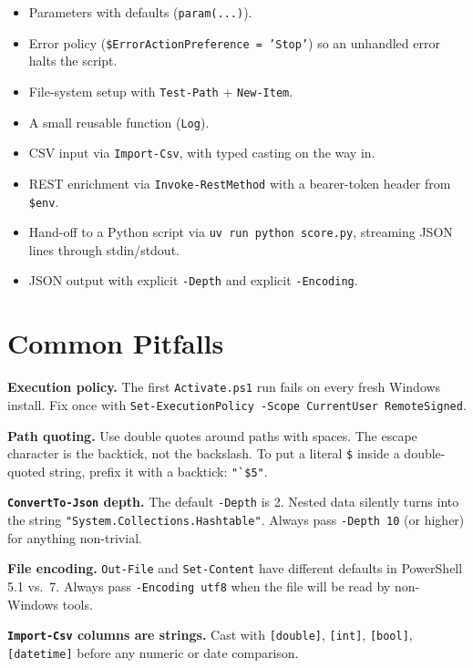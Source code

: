 \documentclass[11pt,a4paper]{article}
\newcommand{\cmd}[1]{\texttt{\textcolor{pwshKw}{#1}}}
\begin{document}
\begin{itemize}[leftmargin=*]
\item Parameters with defaults (\texttt{param(...)}).
\item Error policy (\texttt{\$ErrorActionPreference = 'Stop'}) so an
unhandled error halts the script.
\item File-system setup with \cmd{Test-Path} + \cmd{New-Item}.
\item A small reusable function (\texttt{Log}).
\item CSV input via \cmd{Import-Csv}, with typed casting on the way in.
\item REST enrichment via \cmd{Invoke-RestMethod} with a bearer-token
header from \texttt{\$env}.
\item Hand-off to a Python script via \texttt{uv run python score.py},
streaming JSON lines through stdin/stdout.
\item JSON output with explicit \texttt{-Depth} and explicit
\texttt{-Encoding}.
\end{itemize}

\section{Common Pitfalls}

\textbf{Execution policy.} The first \texttt{Activate.ps1} run fails on
every fresh Windows install. Fix once with
\texttt{Set-ExecutionPolicy -Scope CurrentUser RemoteSigned}.

\textbf{Path quoting.} Use double quotes around paths with spaces.
The escape character is the backtick, not the backslash. To put a
literal \texttt{\$} inside a double-quoted string, prefix it with a
backtick: \texttt{"`\$5"}.

\textbf{\cmd{ConvertTo-Json} depth.} The default \texttt{-Depth} is 2.
Nested data silently turns into the string
\texttt{"System.Collections.Hashtable"}. Always pass
\texttt{-Depth 10} (or higher) for anything non-trivial.

\textbf{File encoding.} \cmd{Out-File} and \cmd{Set-Content} have
different defaults in PowerShell 5.1 vs.\ 7. Always pass
\texttt{-Encoding utf8} when the file will be read by non-Windows
tools.

\textbf{\texttt{Import-Csv} columns are strings.} Cast with
\texttt{[double]}, \texttt{[int]}, \texttt{[bool]},
\texttt{[datetime]} before any numeric or date comparison.
\end{document}

